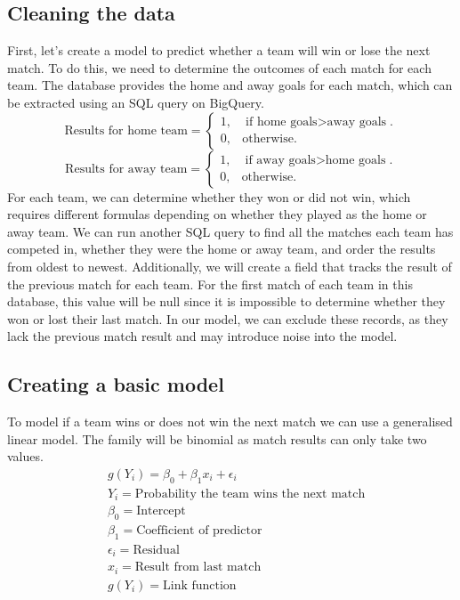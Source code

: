 \documentclass{article}
\begin{document}
\subsection{Cleaning the data}
First, let’s create a model to predict whether a team will win or lose the next match. To do this, we need to determine the outcomes of each match for each team. The database provides the home and away goals for each match, which can be extracted using an SQL query on BigQuery.\\
\begin{equation*}
  \text{Results for home team}=\begin{cases}
    1, & \text{if home goals$>$away goals}.\\
    0, & \text{otherwise}.
  \end{cases}
\end{equation*}
\begin{equation*}
  \text{Results for away team}=\begin{cases}
    1, & \text{if away goals$>$home goals}.\\
    0, & \text{otherwise}.
  \end{cases}
\end{equation*}
For each team, we can determine whether they won or did not win, which requires different formulas depending on whether they played as the home or away team. We can run another SQL query to find all the matches each team has competed in, whether they were the home or away team, and order the results from oldest to newest. \newline
\newline
Additionally, we will create a field that tracks the result of the previous match for each team. For the first match of each team in this database, this value will be null since it is impossible to determine whether they won or lost their last match. In our model, we can exclude these records, as they lack the previous match result and may introduce noise into the model.
\subsection{Creating a basic model}
To model if a team wins or does not win the next match we can use a generalised linear model. The family will be binomial as match results can only take two values.
\begin{align*}
    &g(Y_i)=\beta_0+\beta_1x_i+\epsilon_i\\
    &Y_i=\text{Probability the team wins the next match}\\
    &\beta_0=\text{Intercept}\\
    &\beta_1=\text{Coefficient of predictor}\\
    &\epsilon_i=\text{Residual}\\
    &x_i=\text{Result from last match} \\
    &g(Y_i)=\text{Link function}
\end{align*}
\end{document}
